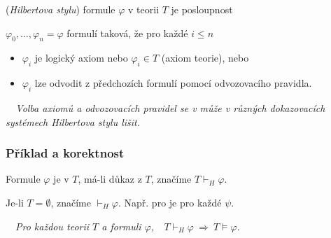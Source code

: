     \vspace{-1mm}
     (\emph{Hilbertova stylu}) formule $\varphi$ v teorii $T$ je  posloupnost
    \smallskip
    
    $\varphi_0, \dots, \varphi_n=\varphi$ formulí taková, že pro každé $i\le n$
    \begin{itemize}
    \item $\varphi_i$ je logický axiom nebo $\varphi_i \in T$ (axiom teorie), nebo
    \item $\varphi_i$ lze odvodit z předchozích formulí pomocí odvozovacího pravidla.
    \end{itemize}
    
    \medskip
    
    {\it {}\ \ Volba axiomů a odvozovacích pravidel se v může v různých dokazovacích systémech Hilbertova stylu lišit.}
    
    \subsubsection*{Příklad a korektnost}
    Formule $\varphi$ je  v $T$, má-li důkaz z $T$, značíme $T \vdash_{H} \varphi$.
    \smallskip
    
    Je-li $T=\emptyset$, značíme $\vdash_H \varphi$. Např. pro  je  pro každé $\psi$.
    
    \vspace{-4mm}
    {\bf {}}\ \ {\it  Pro každou teorii $T$ a formuli $\varphi$,\ \ $T\vdash_H \varphi\ \Rightarrow\ T\models \varphi$.}
    \smallskip
    
